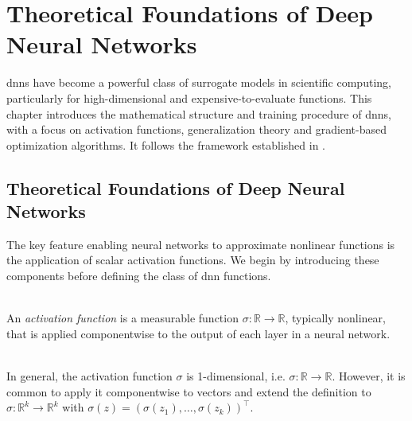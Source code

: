 \chapter{Theoretical Foundations of Deep Neural Networks}
\label{chapter5}

\acfp{dnn} have become a powerful class of surrogate models in scientific
computing, particularly for high-dimensional and expensive-to-evaluate
functions. This chapter introduces the mathematical structure and training
procedure of \acp{dnn}, with a focus on activation functions, generalization
theory and gradient-based optimization algorithms. It follows the framework
established in \cite{mishra2021enhancing}.

\section{Theoretical Foundations of Deep Neural Networks}
\label{sec:dnn-definition}

The key feature enabling neural networks to approximate nonlinear functions is
the application of scalar activation functions. We begin by introducing these
components before defining the class of \acl{dnn} functions.

\begin{definition} \ \\
An \emph{activation function} is a measurable function $\sigma : \mathbb{R} \to
\mathbb{R}$, typically nonlinear, that is applied componentwise to the output of
each layer in a neural network.
\end{definition}

\begin{remark} \ \\
    In general, the activation function $\sigma$ is 1-dimensional, i.e. $\sigma: \mathbb{R} \to \mathbb{R}$. However, it is common to apply it componentwise to vectors and extend the definition to $\sigma: \mathbb{R}^k \to \mathbb{R}^k$ with $\sigma(z) = (\sigma(z_1), \dots, \sigma(z_k))^\top$.
\end{remark}

